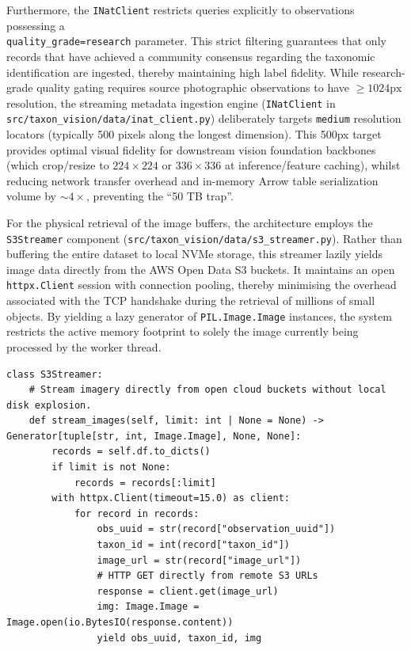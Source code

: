 Furthermore, the \texttt{INatClient} restricts queries explicitly to observations possessing a\\\texttt{quality\_grade=research} parameter. This strict filtering guarantees that only records that have achieved a community consensus regarding the taxonomic identification are ingested, thereby maintaining high label fidelity. While research-grade quality gating requires source photographic observations to have $\ge 1024\text{px}$ resolution, the streaming metadata ingestion engine (\texttt{INatClient} in\\\texttt{src/taxon\_vision/data/inat\_client.py}) deliberately targets \texttt{medium} resolution locators (typically 500 pixels along the longest dimension). This 500px target provides optimal visual fidelity for downstream vision foundation backbones (which crop/resize to $224\times 224$ or $336\times 336$ at inference/feature caching), whilst reducing network transfer overhead and in-memory Arrow table serialization volume by $\sim 4\times$, preventing the ``50 TB trap''.

For the physical retrieval of the image buffers, the architecture employs the \texttt{S3Streamer} component (\texttt{src/taxon\_vision/data/s3\_streamer.py}). Rather than buffering the entire dataset to local NVMe storage, this streamer lazily yields image data directly from the AWS Open Data S3 buckets. It maintains an open \texttt{httpx.Client} session with connection pooling, thereby minimising the overhead associated with the TCP handshake during the retrieval of millions of small objects. By yielding a lazy generator of \texttt{PIL.Image.Image} instances, the system restricts the active memory footprint to solely the image currently being processed by the worker thread.

\begin{listing}[htbp]
\begin{verbatim}
class S3Streamer:
    # Stream imagery directly from open cloud buckets without local disk explosion.
    def stream_images(self, limit: int | None = None) -> Generator[tuple[str, int, Image.Image], None, None]:
        records = self.df.to_dicts()
        if limit is not None:
            records = records[:limit]
        with httpx.Client(timeout=15.0) as client:
            for record in records:
                obs_uuid = str(record["observation_uuid"])
                taxon_id = int(record["taxon_id"])
                image_url = str(record["image_url"])
                # HTTP GET directly from remote S3 URLs
                response = client.get(image_url)
                img: Image.Image = Image.open(io.BytesIO(response.content))
                yield obs_uuid, taxon_id, img
\end{verbatim}
\caption{Lazy generation of streaming image buffers within \texttt{S3Streamer}.}
\label{lst:s3_streamer}
\end{listing}

